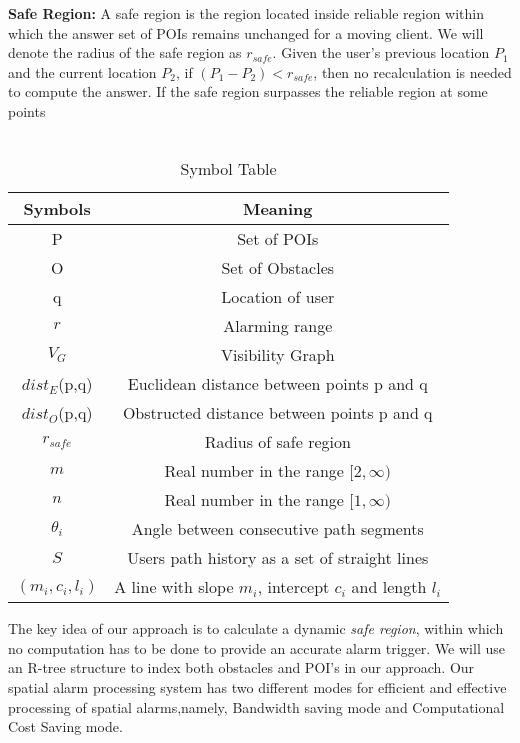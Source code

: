 \textbf{Safe Region:} A safe region is the region located inside reliable region within which the answer set of POIs remains unchanged for a moving client. We will denote the radius of the safe region as $r_{safe}$. Given the user's previous location $P_1$ and the current location $P_2$, if $(P_1 - P_2) < r_{safe}$, then no recalculation is needed to compute the answer. If the safe region surpasses the reliable region at some points 
\\ \\

\begin{table}[h]
\centering 

\caption{Symbol Table}
\begin{tabular}{|c|c|} \hline
Symbols&Meaning \\ \hline
P & Set of POIs\\ \hline
O & Set of Obstacles\\ \hline
q & Location of user\\ \hline
$r$ & Alarming range\\ \hline
$V_{G}$       & Visibility Graph\\ \hline
$dist_E$(p,q) & Euclidean distance between points p and q\\ \hline
$dist_O$(p,q) & Obstructed distance between points p and q\\ \hline
$r_{safe}$    & Radius of safe region\\ \hline
$m$           & Real number in the range $[2,\infty)$ \\ \hline
$n$           & Real number in the range $[1,\infty) $  \\ \hline
$\theta_i $   & Angle between consecutive path segments \\ \hline 
$ S $         & Users path history as a set of straight lines \\ \hline
$(m_i,c_i,l_i)$ & A line with slope $m_i$, intercept $c_i$ and length $l_i$ \\ \hline

\end{tabular}
\end{table}
\vspace*{12pt}

The key idea of our approach is to calculate a dynamic \textit{safe region}, within which no computation has to be done to provide an accurate alarm trigger. We will use an R-tree structure to index both obstacles and POI's in our approach. Our spatial alarm processing system has two different modes for efficient and effective processing of spatial alarms,namely, Bandwidth saving mode and Computational Cost Saving mode.

